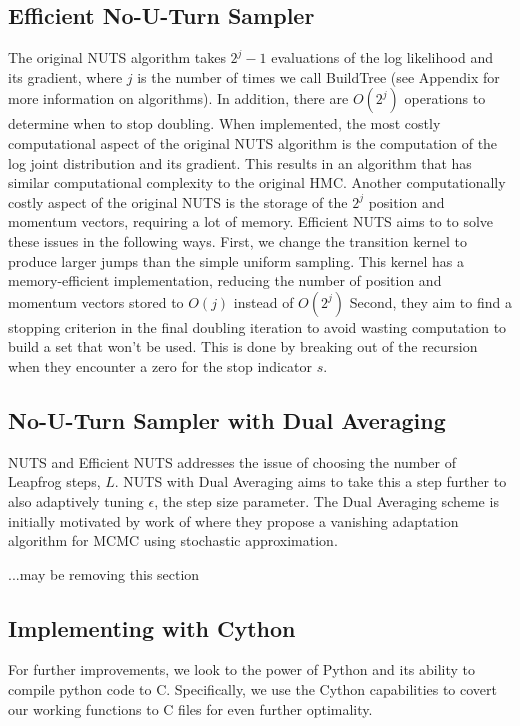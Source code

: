 \documentclass[12pt]{article}
\begin{document}
\subsection{Efficient No-U-Turn Sampler}
The original NUTS algorithm takes $2^j -1$ evaluations of the log likelihood and its gradient, where $j$ is the number of times we call BuildTree (see Appendix for more information on algorithms). In addition, there are $O(2^j)$ operations to determine when to stop doubling. When implemented, the most costly computational aspect of the original NUTS algorithm is the computation of the log joint distribution and its gradient. This results in an algorithm that has similar computational complexity to the original HMC. Another computationally costly aspect of the original NUTS is the storage of the $2^j$ position and momentum vectors, requiring a lot of memory.  Efficient NUTS aims to to solve these issues in the following ways. First, we change the transition kernel to produce larger jumps than the simple uniform sampling. This kernel has a memory-efficient implementation, reducing the number of position and momentum vectors stored to $O(j)$ instead of $O(2^j)$ Second, they aim to find a stopping criterion in the final doubling iteration to avoid wasting computation to build a set that won't be used. This is done by breaking out of the recursion when they encounter a zero for the stop indicator $s$.
  
\subsection{No-U-Turn Sampler with Dual Averaging}
NUTS and Efficient NUTS addresses the issue of choosing the number of Leapfrog steps, $L$. NUTS with Dual Averaging aims to take this a step further to also adaptively tuning $\epsilon$, the step size parameter. The Dual Averaging scheme is initially motivated by work of \cite{robbins} where they propose a vanishing adaptation algorithm for MCMC using stochastic approximation. 

...may be removing this section

\subsection{Implementing with Cython}
For further improvements, we look to the power of Python and its ability to compile python code to C. Specifically, we use the Cython capabilities to covert our working functions to C files for even further optimality. 
\end{document}
